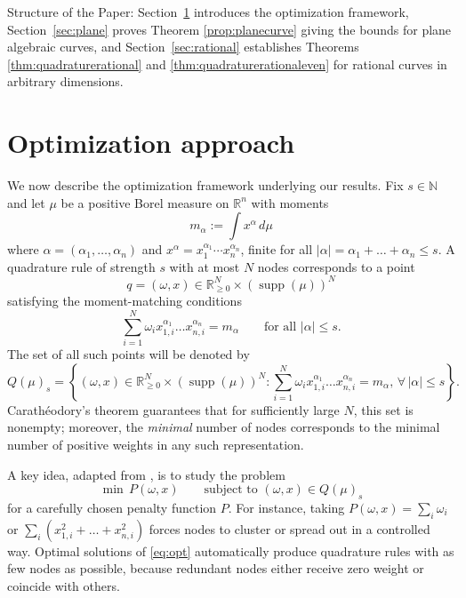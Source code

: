 \documentclass[11pt,a4paper]{amsart}
\makeatletter
\numberwithin{equation}{section}
\theoremstyle{definition}
\newcommand{\R}{\mathbb{R}}
\numberwithin{thm}{section}
\def\paragraph{\@startsection{paragraph}{4}%
  \z@{.5\linespacing\@plus.7\linespacing}{-.5em}%
  {\normalfont\normalsize\bfseries}}
\theoremstyle{break}
\numberwithin{subcase}{case}
\makeatother
\begin{document}
\paragraph{Structure of the Paper:} Section~\ref{sec:optimization} introduces the optimization framework, Section~\ref{sec:plane} proves Theorem \ref{prop:planecurve} giving the bounds for plane algebraic curves, and Section~\ref{sec:rational} establishes Theorems \ref{thm:quadraturerational} and \ref{thm:quadraturerationaleven} for rational curves in arbitrary dimensions.



\section{Optimization approach}\label{sec:optimization}

We now describe the optimization framework underlying our results. Fix $s \in \mathbb{N}$ and let $\mu$ be a {positive} Borel measure on $\R^n$ with moments  
\[
m_{\alpha} := \int x^\alpha \, d\mu
\]
where $\alpha=(\alpha_1,\dots,\alpha_n)$ and $x^\alpha=x_1^{\alpha_1}\cdots x_n^{\alpha_n}$, finite for all $|\alpha|=\alpha_1+\dots+\alpha_n \le s$. A quadrature rule of strength $s$ with at most $N$ nodes corresponds to a point  
\[
q = (\omega, x) \in \R^N_{\ge 0} \times (\operatorname{supp}(\mu))^N
\]
satisfying the moment-matching conditions
\[
\sum_{i=1}^N \omega_i x_{1,i}^{\alpha_1}\dots x_{n,i}^{\alpha_n}= m_{\alpha} \qquad \text{for all } |\alpha|\le s.
\]
The set of all such points will be denoted by  
\[
Q(\mu)_s = \left\{ (\omega, x) \in \R^N_{\ge 0} \times (\operatorname{supp}(\mu))^N : 
\sum_{i=1}^N \omega_i x_{1,i}^{\alpha_1}\dots x_{n,i}^{\alpha_n}= m_{\alpha} , \, \forall\, |\alpha| \le s \right\}.
\]
Carathéodory’s theorem guarantees that for sufficiently large $N$, this set is nonempty; moreover, the \emph{minimal} number of nodes corresponds to the minimal number of positive weights in any such representation.

A key idea, adapted from  \cite{RS}, is to study the problem
\begin{equation}\label{eq:opt}
  \min \, P(\omega,x) \qquad \text{subject to } (\omega,x)\in Q(\mu)_s
\end{equation}
for a carefully chosen penalty function $P$. For instance, taking $P(\omega,x)=\sum_i \omega_i$ or $\sum_i (x_{1,i}^2+\dots+x_{n,i}^2)$ forces nodes to cluster or spread out in a controlled way. Optimal solutions of \eqref{eq:opt} automatically produce quadrature rules with as few nodes as possible, because redundant nodes either receive zero weight or coincide with others.  
\end{document}
